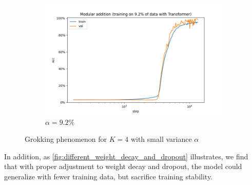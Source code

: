 \begin{figure}[!ht]
\begin{subfigure}{0.3\textwidth}
		\includegraphics[width=\linewidth]{fig/Transformer_p=31/K=4/dropout=0.1,wd=0.1/alpha=9.2_dropout=0.1_wd=0.1/addition_9.2_Transformer_step.png}
		\caption{$\alpha=9.2\%$}
		\label{fig:alpha=9.2}
	\end{subfigure}
	\caption{Grokking phenomenon for $K=4$ with small variance $\alpha$}
	\label{fig:K=4}
\end{figure}

In addition, as \cref{fig:different_weight_decay_and_dropout} illustrates, we find that with proper adjustment to weight decay and dropout, the model could generalize with fewer training data, but sacrifice training stability.

